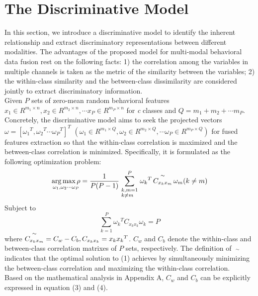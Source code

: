 \documentclass[10pt,journal,compsoc]{IEEEtran}
\begin{document}
\section{The Discriminative Model}
In this section, we introduce a discriminative model to identify the inherent relationship and extract discriminatory representations between different modalities. The advantages of the proposed model for multi-modal behavioral data fusion rest on the following facts: 1) the correlation among the variables in multiple channels is taken as the metric of the similarity between the variables; 2) the within-class similarity and the between-class dissimilarity are considered jointly to extract discriminatory information.\\\indent Given \emph{$ P $} sets of zero-mean random behavioral features ${x_1} \in {R^{{m_1} \times n}},{x_2} \in {R^{{m_2} \times n}}, \cdots {x_P} \in {R^{{m_P} \times n}}$ for \textit{c} classes and $Q = {m_1} + {m_2} +  \cdots {m_P}$. Concretely, the discriminative model aims to seek the projected vectors $\omega  = {[{\omega _1}^T,{\omega _2}^T \cdots {\omega _P}^T]^T}$ $({\omega_1} \in {R^{{m_1} \times Q}},{\omega_2} \in {R^{{m_2} \times Q}}, \cdots {\omega_P} \in {R^{{m_P} \times Q}})$ for fused features extraction so that the within-class correlation is maximized and the between-class correlation is minimized. Specifically, it is formulated as the following optimization problem:
\begin{equation} \mathop {\arg \max \rho }\limits_{{\omega _1},{\omega _2} \cdots {\omega _P}}  = \frac{1}{{P(P - 1)}}\sum\limits_{\scriptstyle k,m = 1\hfill\atop \scriptstyle{\rm{ }}k \ne m\hfill}^P {{\omega _k}^T\mathop {{C_{{x_k}{x_m}}}}\limits^ \sim  {\omega _m}} {\rm{  (}}k \ne m{\rm{)}} \end{equation}
Subject to
\begin{equation} \sum\limits_{k = 1}^P {{\omega _k}^T{C_{{x_k}{x_k}}}{\omega _k}}  = P \end{equation}
where $\mathop {{C_{{x_k}{x_m}}}} \limits^ \sim  = {C_w} -  {C_b},{\rm{ }}{C_{{x_k}{x_k}}} = {x_k}{x_k}^T$. ${C_w}$ and ${C_b}$ denote the within-class and between-class correlation matrixes of \emph{$ P $} sets, respectively. The definition of $\mathop {{C_{{x_k}{x_m}}}}\limits^ \sim$ indicates that the optimal solution to (1) achieves by simultaneously minimizing the between-class correlation and maximizing the within-class correlation.\\\indent Based on the mathematical analysis in Appendix A, $C_w$ and $C_b$ can be explicitly expressed in equation (3) and (4).
\end{document}
